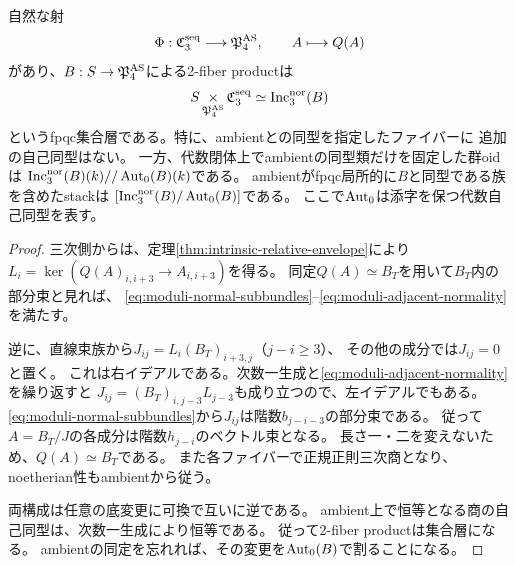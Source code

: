 \begin{theorem}
\label{thm:moduli-incidence-equivalence}
自然な射
\begin{equation}\label{eq:moduli-main-arrow}
 \Phi:\mathfrak C^{\rm seq}_3\longrightarrow\mathfrak P^{\rm AS}_4,
 \qquad A\longmapsto Q(A)
\end{equation}
があり、$B:S\to\mathfrak P^{\rm AS}_4$による2-fiber productは
\begin{equation}\label{eq:moduli-full-fibre}
 S\mathop{\times}_{\mathfrak P^{\rm AS}_4}\mathfrak C^{\rm seq}_3
 \simeq\operatorname{Inc}^{\rm nor}_3(B)
\end{equation}
というfpqc集合層である。特に、ambientとの同型を指定したファイバーに
追加の自己同型はない。
一方、代数閉体上でambientの同型類だけを固定した群oidは
$\operatorname{Inc}^{\rm nor}_3(B)(k)//\operatorname{Aut}_0(B)(k)$である。
ambientがfpqc局所的に$B$と同型である族を含めたstackは
$[\operatorname{Inc}^{\rm nor}_3(B)/\operatorname{Aut}_0(B)]$である。
ここで$\operatorname{Aut}_0$は添字を保つ代数自己同型を表す。
\end{theorem}
\begin{proof}
三次側からは、定理\ref{thm:intrinsic-relative-envelope}により
$L_i=\ker(Q(A)_{i,i+3}\to A_{i,i+3})$を得る。
同定$Q(A)\simeq B_T$を用いて$B_T$内の部分束と見れば、
\eqref{eq:moduli-normal-subbundles}--\eqref{eq:moduli-adjacent-normality}を満たす。

逆に、直線束族から$J_{ij}=L_i(B_T)_{i+3,j}$（$j-i\geq3$）、
その他の成分では$J_{ij}=0$と置く。
これは右イデアルである。次数一生成と\eqref{eq:moduli-adjacent-normality}を繰り返すと
$J_{ij}=(B_T)_{i,j-3}L_{j-3}$も成り立つので、左イデアルでもある。
\eqref{eq:moduli-normal-subbundles}から$J_{ij}$は階数$b_{j-i-3}$の部分束である。
従って$A=B_T/J$の各成分は階数$h_{j-i}$のベクトル束となる。
長さ一・二を変えないため、$Q(A)\simeq B_T$である。
また各ファイバーで正規正則三次商となり、noetherian性もambientから従う。

両構成は任意の底変更に可換で互いに逆である。
ambient上で恒等となる商の自己同型は、次数一生成により恒等である。
従って2-fiber productは集合層になる。
ambientの同定を忘れれば、その変更を$\operatorname{Aut}_0(B)$で割ることになる。
\end{proof}

